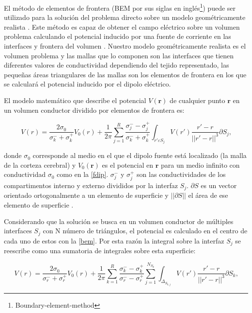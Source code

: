 El método de elementos de frontera (BEM por sus siglas en inglés\footnote{Boundary-element-method}) puede ser utilizado para la solución del problema directo sobre un modelo geométricamente realista \cite{Ermer2001}. Este método es capaz de obtener el campo eléctrico sobre un volumen problema calculando el potencial inducido por una fuente de corriente en las interfaces y frontera del volumen \cite{Hallez2007}. Nuestro modelo geométricamente realista es el volumen problema y las mallas que lo componen son las interfaces que tienen diferentes valores de conductividad dependiendo del tejido representado, las pequeñas áreas triangulares de las mallas son los elementos de frontera en los que se calculará el potencial inducido por el dipolo eléctrico.

El modelo matemático que describe el potencial $V(\mathbf{r})$ de cualquier punto $\mathbf{r}$ en un volumen conductor dividido por elementos de frontera es:

\begin{equation}
	\label{bem}
	V(r) = \frac{2\sigma_{0}}{\sigma_{k}^{-} + {\sigma_{k}^{+}}} V_{0}(r) + \frac{1}{2\pi} \sum_{j=1}^{R}\frac{\sigma_{j}^{-}-\sigma_{j}^{+}}{\sigma_{k}^{-}+\sigma_{k}^{+}} \int_{r'\varepsilon S_{j}} V(r') \frac{r'-r}{||r'-r||^3}\partial S_{j}\text{,}
\end{equation}

donde $\sigma_{0}$ corresponde al medio en el que el dipolo fuente está localizado (la malla de la corteza cerebral) y $V_{0}(\mathbf{r})$ es el potencial en $\mathbf{r}$ para un medio infinito con conductividad $\sigma_{0}$ como en la \cref{fdip}. $\sigma_{j}^{-}$ y $\sigma_{j}^{+}$ son las conductividades de los compartimentos interno y externo divididos por la interfaz $S_{j}$. $\partial S$ es un vector orientado ortogonalmente a un elemento de superficie y $||\partial S||$ el área de ese elemento de superficie \cite{Hallez2007}. 

Considerando que la solución se busca en un volumen conductor de múltiples interfaces $S_{j}$ con N número de triángulos, el potencial es calculado en el centro de cada uno de estos con la \cref{bem}. Por esta razón la integral sobre la interfaz $S_{j}$ se reescribe como una sumatoria de integrales sobre esta superficie:

\begin{equation}
	\label{bem2}
	V(r) = \frac{2\sigma_{0}}{\sigma_{r}^{-} + {\sigma_{r}^{+}}} V_{0}(r) + \frac{1}{2\pi} \sum_{k=1}^{R}\frac{\sigma_{k}^{-}-\sigma_{k}^{+}}{\sigma_{r}^{-}-\sigma_{r}^{+}} \sum_{j=1}^{N_{S_{k}}} \int_{\Delta_{S_{k,j}}} V(r') \frac{r'-r}{||r'-r||^3}\partial S_{k}\text{,}
\end{equation}

